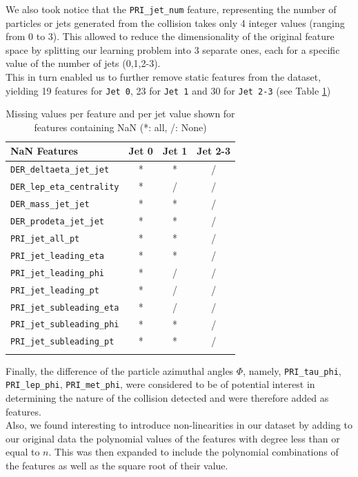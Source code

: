 \documentclass[10pt,conference,compsocconf]{IEEEtran}
\begin{document}
We also took notice that the \verb+PRI_jet_num+ feature, representing the number of particles or jets generated from the collision takes only 4 integer values (ranging from 0 to 3). This allowed to reduce the dimensionality of the original feature space by splitting our learning problem into 3 separate ones, each for a specific value of the number of jets (0,1,2-3).\\
This in turn enabled us to further remove static features from the dataset, yielding 19 features for  \verb+Jet 0+, 23 for \verb+Jet 1+ and 30 for \verb+Jet 2-3+ (see Table \ref{tab_feats})
\begin{table}[h!]
\centering
\caption{Missing values per feature and per jet value shown for features containing NaN (*: all, /: None)}
\footnotesize
\hspace{-0.2cm}
\begin{tabular}{ l| ccc } 
 \hline
   NaN Features & Jet 0 & Jet 1 & Jet 2-3 \\
 \hline
   \verb+DER_deltaeta_jet_jet+  & * & * & /  \\
   \verb+DER_lep_eta_centrality+  & * & / & / \\
   \verb+DER_mass_jet_jet+  & * & * & / \\
   \verb+DER_prodeta_jet_jet+  & * & * & /  \\ 
   \verb+PRI_jet_all_pt+  & * & * & /  \\
   \verb+PRI_jet_leading_eta+  & * & * & / \\
   \verb+PRI_jet_leading_phi+  & * & / & /   \\
   \verb+PRI_jet_leading_pt+  & * & / & / \\
   \verb+PRI_jet_subleading_eta+  & * & / & / \\
   \verb+PRI_jet_subleading_phi+  & * & * & /  \\
   \verb+PRI_jet_subleading_pt+  & * & * & /  \\
  \hline
\label{tab_feats}
\end{tabular}
\end{table}

Finally, the difference of the particle azimuthal angles $\Phi$, namely, \verb+PRI_tau_phi+, \verb+PRI_lep_phi+, \verb+PRI_met_phi+, were considered to be of potential interest  in determining the nature of the collision detected and were therefore added as features. \\
Also, we found interesting to introduce non-linearities in our dataset by adding to our original data the  polynomial values of the features with degree less than or equal to $n$. This was then expanded to include the polynomial combinations of the features as well as the square root of their value. 
\end{document}
